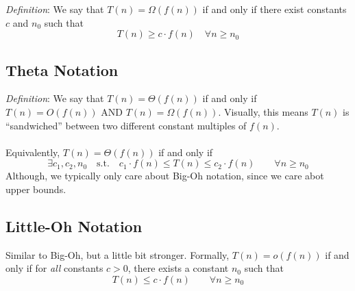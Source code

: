 \documentclass[a4paper,12pt]{scrartcl}
\begin{document}
{\sl Definition}: We say that $T(n)=\Omega(f(n))$ if 
and only if there exist constants $c$ and $n_0$
such that 
    \[ T(n) \geq c\cdot f(n) \quad \forall n\geq n_0 \]

\subsection{Theta Notation}

{\sl Definition}: We say that $T(n) =\Theta(f(n))$ if
and only if $T(n)=O(f(n))$ AND $T(n) = \Omega(f(n))$.
Visually, this means $T(n)$ is ``sandwiched''
between two different constant multiples of $f(n)$.
\\
\\
Equivalently, $T(n) =\Theta(f(n))$ if and only if
\[ \exists c_1, c_2, n_0 \quad \text{s.t.}
    \quad c_1 \cdot f(n) \leq T(n) \leq c_2 \cdot f(n)
    \qquad \forall n\geq n_0 \]
Although, we typically only care about Big-Oh notation,
since we care abot upper bounds.

\subsection{Little-Oh Notation}

Similar to Big-Oh, but a little bit stronger. 
Formally, $T(n) = o(f(n))$ if and only
if for \emph{all} constants $c>0$, there exists 
a constant $n_0$ such that
    \[ T(n) \leq c\cdot f(n) \qquad \forall n \geq n_0 \]
\end{document}
